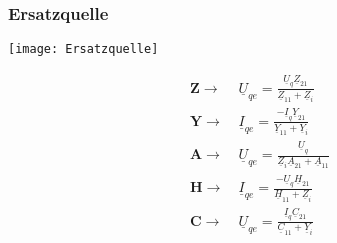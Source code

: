 \subsubsection{Ersatzquelle}
\centering\texttt{[image: Ersatzquelle]}
\begin{mdframed}[style=exercise]
    \begin{align*}
        \boldsymbol{Z}\rightarrow&\  \underline{U}_{qe} = \frac{\underline{U}_q\underline{Z}_{21}}{\underline{Z}_{11}+\underline{Z}_i}\\
        \boldsymbol{Y}\rightarrow&\  \underline{I}_{qe} = \frac{-\underline{I}_q\underline{Y}_{21}}{\underline{Y}_{11}+\underline{Y}_i}\\
        \boldsymbol{A}\rightarrow&\  \underline{U}_{qe} = \frac{\underline{U}_q}{\underline{Z}_i\underline{A}_{21}+\underline{A}_{11}}\\
        \boldsymbol{H}\rightarrow&\  \underline{I}_{qe} = \frac{-\underline{U}_q\underline{H}_{21}}{\underline{H}_{11}+\underline{Z}_i}\\
        \boldsymbol{C}\rightarrow&\  \underline{U}_{qe} = \frac{\underline{I}_q\underline{C}_{21}}{\underline{C}_{11}+\underline{Y}_i}\\
    \end{align*}
\end{mdframed}
\raggedright

